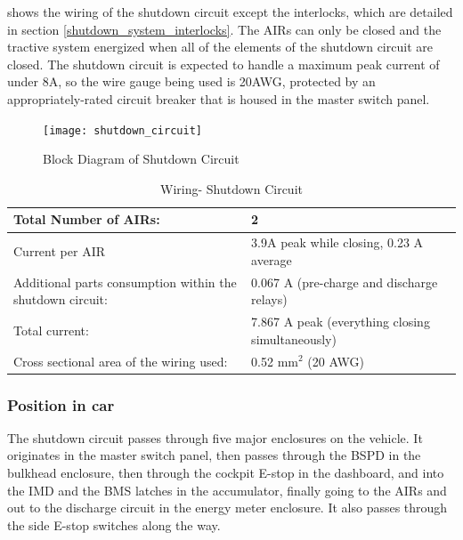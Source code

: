 \documentclass{article}
\begin{document}
	 shows the wiring of the shutdown circuit except the interlocks, which are detailed in section \ref{shutdown_system_interlocks}. The AIRs can only be closed and the tractive system energized when all of the elements of the shutdown circuit are closed. The shutdown circuit is expected to handle a maximum peak current of under 8A, so the wire gauge being used is 20AWG, protected by an appropriately-rated circuit breaker that is housed in the master switch panel. 


	\begin{figure}
        \texttt{[image: shutdown\_circuit]}
        \caption{Block Diagram of Shutdown Circuit}
        \label{fig:shutdown_circuit}
    \end{figure}

	\begin{table}[H]
        \centering
        \begin{tabular}{|l|l|}
        \hline
            Total Number of AIRs: & 2 \\ \hline
            Current per AIR & 3.9A peak while closing, 0.23 A average\\ \hline
            Additional parts consumption within the shutdown circuit: & 0.067 A (pre-charge and discharge relays)  \\ \hline
            Total current: & 7.867 A peak (everything closing simultaneously) \\ \hline
            Cross sectional area of the wiring used: & 0.52 mm$^2$ (20 AWG) \\ \hline
        \end{tabular}
        \caption{Wiring- Shutdown Circuit}
        \label{ShutdownCircuitTable}
    \end{table}

\subsubsection{Position in car}
The shutdown circuit passes through five major enclosures on the vehicle. It originates in the master switch panel, then passes through the BSPD in the bulkhead enclosure, then through the cockpit E-stop in the dashboard, and into the IMD and the BMS latches in the accumulator, finally going to the AIRs and out to the discharge circuit in the energy meter enclosure. It also passes through the side E-stop switches along the way. \newline
\end{document}
